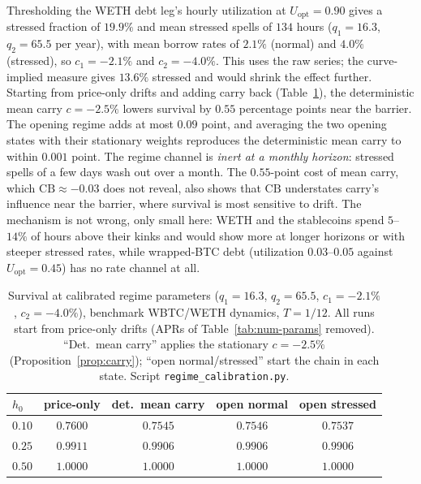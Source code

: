 \documentclass[11pt]{article}
\theoremstyle{plain}
\theoremstyle{definition}
\theoremstyle{remark}
\begin{document}
Thresholding the WETH debt leg's hourly utilization at $U_{\mathrm{opt}}=0.90$ gives a stressed
fraction of $19.9\%$ and mean stressed spells of $134$ hours ($q_1=16.3$, $q_2=65.5$ per year), with
mean borrow rates of $2.1\%$ (normal) and $4.0\%$ (stressed), so $c_1=-2.1\%$ and $c_2=-4.0\%$.
This uses the raw series; the curve-implied measure gives $13.6\%$ stressed and would shrink the
effect further. Starting from price-only drifts and adding carry back (Table~\ref{tab:regime}), the
deterministic mean carry $c=-2.5\%$ lowers survival by $0.55$ percentage points near the barrier. The
opening regime adds at most $0.09$ point, and averaging the two opening states with their stationary
weights reproduces the deterministic mean carry to within $0.001$ point. The regime channel
is \emph{inert at a monthly horizon}: stressed spells of a few days wash out over a month. The
$0.55$-point cost of mean carry, which $\mathrm{CB}\approx-0.03$ does not reveal, also shows that
$\mathrm{CB}$ understates carry's influence near the barrier, where survival is most sensitive to
drift. The mechanism is not wrong, only small here: WETH and the stablecoins spend $5$--$14\%$ of
hours above their kinks and would show more at longer horizons or with steeper stressed rates, while
wrapped-BTC debt (utilization $0.03$--$0.05$ against $U_{\mathrm{opt}}=0.45$) has no rate channel at
all.

\begin{table}[ht]
\centering
\small
\begin{tabular}{lcccc}
\toprule
$h_0$ & price-only & det.\ mean carry & open normal & open stressed \\
\midrule
$0.10$ & $0.7600$ & $0.7545$ & $0.7546$ & $0.7537$ \\
$0.25$ & $0.9911$ & $0.9906$ & $0.9906$ & $0.9906$ \\
$0.50$ & $1.0000$ & $1.0000$ & $1.0000$ & $1.0000$ \\
\bottomrule
\end{tabular}
\caption{Survival at calibrated regime parameters ($q_1=16.3$, $q_2=65.5$, $c_1=-2.1\%$,
$c_2=-4.0\%$), benchmark WBTC/WETH dynamics, $T=1/12$. All runs start from price-only drifts (APRs of
Table~\ref{tab:num-params} removed). ``Det.\ mean carry'' applies the stationary $c=-2.5\%$
(Proposition~\ref{prop:carry}); ``open normal/stressed'' start the chain in each state. Script
\texttt{regime\_calibration.py}.}
\label{tab:regime}
\end{table}
\end{document}
